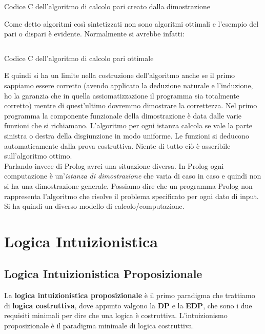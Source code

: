 \documentclass[a4paper,12pt, oneside]{book}
\begin{document}
\begin{listing}
  \inputminted{c}{``code/pari.c''}
  \caption{Codice C dell'algoritmo di calcolo pari creato dalla dimostrazione}
  \label{lst:pari}
\end{listing}
Come detto algoritmi così sintetizzati non sono algoritmi ottimali e l'esempio
del pari o dispari è evidente. Normalmente si avrebbe infatti:
\begin{listing}[H]
  \inputminted{c}{``code/pariopt.c''}
  \caption{Codice C dell'algoritmo di calcolo pari ottimale}
  \label{lst:pari2}
\end{listing}
E quindi si ha un limite nella costruzione dell'algoritmo anche se il primo
sappiamo essere corretto (avendo applicato la deduzione naturale e l'induzione,
ho la garanzia che in quella assiomatizzazione il programma sia totalmente
corretto) mentre di quest'ultimo dovremmo dimostrare la correttezza. Nel primo
programma la componente funzionale della dimostrazione è data dalle varie
funzioni che si richiamano. L'algoritmo per ogni istanza calcola se vale la
parte sinistra o destra della disgiunzione in modo uniforme. Le funzioni si
deducono automaticamente dalla prova costruttiva. Niente di tutto ciò è
asseribile sull'algoritmo ottimo.\\ 
Parlando invece di Prolog avrei una situazione diversa. In Prolog ogni
computazione è un'\textit{istanza di dimostrazione} che varia di caso in caso e
quindi non si ha una dimostrazione generale. Possiamo dire che un programma
Prolog non rappresenta l'algoritmo che risolve il problema specificato per ogni
dato di input. Si ha quindi un diverso modello di calcolo/computazione.
\chapter{Logica Intuizionistica}
\section{Logica Intuizionistica Proposizionale}
La \textbf{logica intuizionistica proposizionale} è il primo paradigma che
trattiamo di \textbf{logica costruttiva}, dove appunto valgono la \textbf{DP} e
la \textbf{EDP}, che sono i due requisiti minimali per dire che una logica è
costruttiva. L'intuizionismo proposizionale è il paradigma minimale di logica
costruttiva. 
\end{document}
